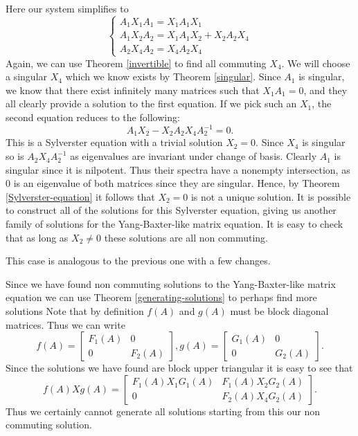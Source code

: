 \documentclass{article}
\begin{document}
\begin{algorithm}
  \begin{case}[$X_3 = 0, X_2 \neq 0$]
    Here our system simplifies to
    \[\begin{cases}
      A_1 X_1 A_1 = X_1 A_1 X_1\\
      A_1 X_2 A_2 = X_1 A_1 X_2 + X_2 A_2 X_4\\
      A_2 X_4 A_2 = X_4 A_2 X_4
    \end{cases}\]
    Again, we can use Theorem \ref{invertible} to find all commuting $X_4$.
    We will choose a singular $X_4$ which we know exists by Theorem \ref{singular}.
    Since $A_1$ is singular, we know that there exist infinitely many matrices such that $X_1 A_1 = 0$, and they all clearly provide a solution to the first equation.
    If we pick such an $X_1$, the second equation reduces to the following:
    \[A_1 X_2 - X_2 A_2 X_4 A_2^{-1} = 0.\]
    This is a Sylverster equation with a trivial solution $X_2 = 0$.
    Since $X_4$ is singular so is $A_2 X_4 A_2^{-1}$ as eigenvalues are invariant under change of basis.
    Clearly $A_1$ is singular since it is nilpotent.
    Thus their spectra have a nonempty intersection, as $0$ is an eigenvalue of both matrices since they are singular.
    Hence, by Theorem \ref{Sylverster-equation} it follows that $X_2 = 0$ is not a unique solution.
    It is possible to construct all of the solutions for this Sylverster equation, giving us another family of solutions for the Yang-Baxter-like matrix equation.
    It is easy to check that as long as $X_2 \neq 0$ these solutions are all non commuting.
  \end{case}

  \begin{case}[$X_2 = 0, X_3 \neq 0$]
    This case is analogous to the previous one with a few changes.
  \end{case}

  Since we have found non commuting solutions to the Yang-Baxter-like matrix equation we can use Theorem \ref{generating-solutions} to perhaps find more solutions
  Note that by definition $f(A)$ and $g(A)$ must be block diagonal matrices.
  Thus we can write
  \[f(A) = \begin{bmatrix} F_1 (A) & 0\\ 0 & F_2 (A) \end{bmatrix}, g(A) = \begin{bmatrix} G_1 (A) & 0\\ 0 & G_2 (A) \end{bmatrix}.\]
  Since the solutions we have found are block upper triangular it is easy to see that
  \[f(A) X g(A) = \begin{bmatrix} F_1 (A) X_1 G_1 (A) & F_1 (A) X_2 G_2 (A)\\ 0 & F_2 (A) X_4 G_2 (A) \end{bmatrix}.\]
  Thus we certainly cannot generate all solutions starting from this our non commuting solution.


\end{algorithm}
\end{document}
